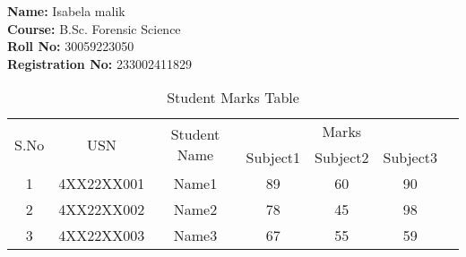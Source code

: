 \documentclass{article}
\begin{document}
\begin{center}
    \textbf{Name:} Isabela malik \\
    \textbf{Course:} B.Sc. Forensic Science \\
    \textbf{Roll No:} 30059223050 \\
    \textbf{Registration No:} 233002411829
\end{center}



\begin{table}[h!]
\centering
\caption{Student Marks Table}
\begin{tabular}{|c|c|c|c|c|c|c|}
\hline
\multirow{2}{*}{S.No} & \multirow{2}{*}{USN} & \multirow{2}{*}{Student Name} & \multicolumn{3}{c|}{Marks} \\ \cline{4-6}
                      &                      &                              & Subject1 & Subject2 & Subject3 \\ \hline
1                     & 4XX22XX001           & Name1                        & 89       & 60       & 90       \\ \hline
2                     & 4XX22XX002           & Name2                        & 78       & 45       & 98       \\ \hline
3                     & 4XX22XX003           & Name3                        & 67       & 55       & 59       \\ \hline
\end{tabular}
\end{table}
\end{document}
